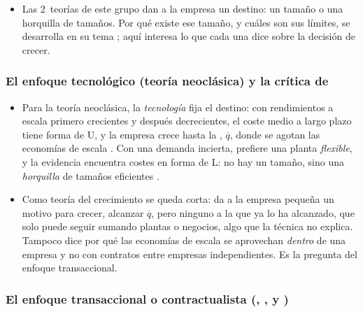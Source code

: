 \documentclass[11pt]{article}
\begin{document}
\begin{itemize}
\item Las 2~teorías de este grupo dan a la empresa un destino: un tamaño o una horquilla de tamaños. Por qué existe ese tamaño, y cuáles son sus límites, se desarrolla en su tema ; aquí interesa lo que cada una dice sobre la decisión de crecer.
\end{itemize}

\subsubsection{El enfoque tecnológico (teoría neoclásica) y la crítica de }\label{sec:enfoque-tecnologico}

\begin{itemize}
\item Para la teoría neoclásica, la \emph{tecnología} fija el destino: con rendimientos a escala primero crecientes y después decrecientes, el coste medio a largo plazo tiene forma de U, y la empresa crece hasta la , $\overline{q}$, donde se agotan las economías de escala . Con una demanda incierta, \textcite{Stigler1939Production} prefiere una planta \emph{flexible}, y la evidencia encuentra costes en forma de L\nocite{Stigler1958Economies}: no hay un tamaño, sino una \emph{horquilla} de tamaños eficientes .
\item Como teoría del crecimiento se queda corta: da a la empresa pequeña un motivo para crecer, alcanzar $\overline{q}$, pero ninguno a la que ya lo ha alcanzado, que solo puede seguir sumando plantas o negocios, algo que la técnica no explica. Tampoco dice por qué las economías de escala se aprovechan \emph{dentro} de una empresa y no con contratos entre empresas independientes. Es la pregunta del enfoque transaccional.
\end{itemize}

\subsubsection{El enfoque transaccional o contractualista (, ,  y )}\label{sec:transaccional}
\end{document}
